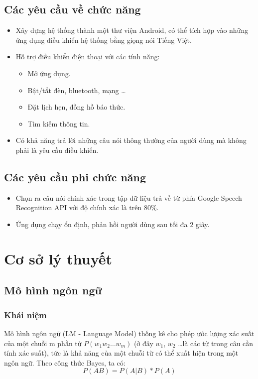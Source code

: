 \documentclass[12pt]{report}
\begin{document}
\section{Các yêu cầu về chức năng} \label{sec:requirement}
\begin{itemize}
	\item Xây dựng hệ thống thành một thư viện Android, có thể tích hợp vào những ứng dụng điều khiển hệ thống bằng giọng nói Tiếng Việt.
	\item Hỗ trợ điều khiển điện thoại với các tính năng:
	\begin{itemize}
		\item Mở ứng dụng.
		\item Bật/tắt đèn, bluetooth, mạng \ldots
		\item Đặt lịch hẹn, đồng hồ báo thức.
		\item Tìm kiếm thông tin.
	\end{itemize}
	\item Có khả năng trả lời những câu nói thông thường của người dùng mà không phải là yêu cầu điều khiển.
\end{itemize}

\section{Các yêu cầu phi chức năng}
\begin{itemize}
	\item Chọn ra câu nói chính xác trong tập dữ liệu trả về từ phía Google Speech Recognition API với độ chính xác là trên 80\%.
	\item Ứng dụng chạy ổn định, phản hồi người dùng sau tối đa 2 giây.
\end{itemize}

\chapter{Cơ sở lý thuyết}
\section{Mô hình ngôn ngữ}
\subsection{Khái niệm}
Mô hình ngôn ngữ (LM - Language Model) thống kê cho phép ước lượng xác suất của một chuỗi m phần tử $P(w_1 w_2 \ldots w_m)$ (ở đây $w_1$, $w_2$ \ldots  là các từ trong câu cần tính xác suất), tức là khả năng của một chuỗi từ có thể xuất hiện trong một ngôn ngữ. Theo công thức Bayes, ta có:
\[P(AB)=P(A|B)*P(A)\]
\end{document}
